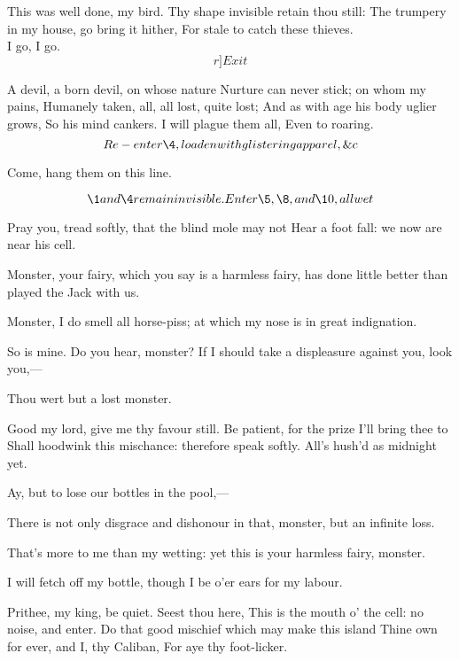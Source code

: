 \documentclass[11pt]{book}
\begin{document}
\1	This was well done, my bird.
	Thy shape invisible retain thou still:
	The trumpery in my house, go bring it hither,
	For stale to catch these thieves. \\

\4	I go, I go. \[r]Exit\]

\1	A devil, a born devil, on whose nature
	Nurture can never stick; on whom my pains,
	Humanely taken, all, all lost, quite lost;
	And as with age his body uglier grows,
	So his mind cankers. I will plague them all,
	Even to roaring. \\

	\[Re-enter \4, loaden with glistering apparel, \&c\]

	Come, hang them on this line.

	\[\1 and \4 remain invisible. Enter \5, \8, and \10, all wet\]

\5	Pray you, tread softly, that the blind mole may not
	Hear a foot fall: we now are near his cell.

\begin{PROSE}

\8	Monster, your fairy, which you say is
	a harmless fairy, has done little better than
	played the Jack with us.

	Monster, I do smell all horse-piss; at
	which my nose is in great indignation.

\8	So is mine. Do you hear, monster? If I should take
	a displeasure against you, look you,---

	Thou wert but a lost monster.

\end{PROSE}

\5	Good my lord, give me thy favour still.
	Be patient, for the prize I'll bring thee to
	Shall hoodwink this mischance: therefore speak softly.
	All's hush'd as midnight yet.

\begin{PROSE}

	Ay, but to lose our bottles in the pool,---

\8	There is not only disgrace and dishonour in that,
	monster, but an infinite loss.

	That's more to me than my wetting: yet this is your
	harmless fairy, monster.

\8	I will fetch off my bottle, though I be o'er ears
	for my labour.

\end{PROSE}

\5	Prithee, my king, be quiet. Seest thou here,
	This is the mouth o' the cell: no noise, and enter.
	Do that good mischief which may make this island
	Thine own for ever, and I, thy Caliban,
	For aye thy foot-licker.
\end{document}
